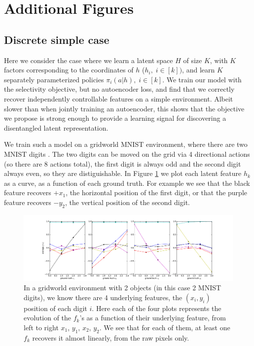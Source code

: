 
\section{Additional Figures}
\subsection{Discrete simple case}
\label{sec:sel-only}
Here we consider the case where we learn a latent space $H$ of size $K$, with $K$ factors corresponding to the coordinates of $h$ ($h_i,\; i\in[k])$, and learn $K$ separately parameterized policies $\pi_i(a|h),\;i\in[k]$. We train our model with the selectivity objective, but no autoencoder loss, and find that we correctly recover independently controllable features on a simple environment.
{%
Albeit slower than when jointly training an autoencoder, this shows that the objective we propose is strong enough to provide a learning signal for discovering a disentangled latent representation.
}

{We train such a model on a gridworld MNIST environment, where there are two MNIST digits \nocite{lecun1998mnist}. The two digits can be moved on the grid via 4 directional actions (so there are 8 actions total), the first digit is always odd and the second digit always even, so they are distiguishable. In Figure \ref{fig:gridworld-only-sel} we plot each latent feature $h_k$ as a curve, as a function of each ground truth. For example we see that the black feature recovers $+x_1$, the horizontal position of the first digit, or that the purple feature recovers $-y_2$, the vertical position of the second digit.}
\begin{figure}[H]
\centering
\includegraphics[width=\linewidth]{articles/icf/figures/latent_vs_gt_005.pdf}
\caption{{%
In a gridworld environment with 2 objects (in this case 2 MNIST digits), we know there are 4 underlying features, the $(x_i,y_i)$ position of each digit $i$. Here each of the four plots represents the evolution of the $f_k$'s as a function of their underlying feature, from left to right $x_1$, $y_1$, $x_2$, $y_2$. We see that for each of them, at least one $f_k$ recovers it almost linearly, from the raw pixels only.}
}
\label{fig:gridworld-only-sel}
\end{figure}


